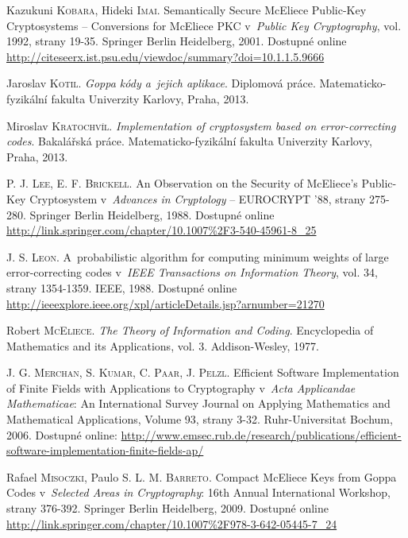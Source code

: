 \documentclass[thesis=M,czech,hidelinks]{FITthesis}[2012/06/26]
\newcommand{\0}{{\textcolor[gray]{0.75}{0}}}
\begin{document}
\begin{thebibliography}{99}
        Kazukuni \textsc{Kobara}, Hideki \textsc{Imai}. Semantically Secure
        McEliece Public-Key Cryptosystems -- Conversions for McEliece PKC
        v~\emph{Public Key Cryptography}, vol. 1992, strany 19-35. Springer
        Berlin Heidelberg, 2001. Dostupné online
        \url{http://citeseerx.ist.psu.edu/viewdoc/summary?doi=10.1.1.5.9666}

        Jaroslav \textsc{Kotil}. \emph{Goppa kódy a~jejich aplikace}. Diplomová
        práce. Matematicko-fyzikální fakulta Univerzity Karlovy, Praha, 2013.

        Miroslav \textsc{Kratochvíl}. \emph{Implementation of cryptosystem based
        on error-correcting codes}. Bakalářská práce. Matematicko-fyzikální
        fakulta Univerzity Karlovy, Praha, 2013.

        P. J. \textsc{Lee}, E. F. \textsc{Brickell}. An Observation on the
        Security of McEliece's Public-Key Cryptosystem v~\emph{Advances in
        Cryptology} -- EUROCRYPT '88, strany 275-280. Springer Berlin
        Heidelberg, 1988. Dostupné online
        \url{http://link.springer.com/chapter/10.1007\%2F3-540-45961-8\_25}

        J. S. \textsc{Leon}. A~probabilistic algorithm for computing minimum
        weights of large error-correcting codes v~\emph{IEEE Transactions on
        Information Theory}, vol. 34, strany 1354-1359. IEEE, 1988. Dostupné
        online
        \url{http://ieeexplore.ieee.org/xpl/articleDetails.jsp?arnumber=21270}

        Robert \textsc{McEliece}. \emph{The Theory of Information and Coding}.
        Encyclopedia of Mathematics and its Applications, vol. 3.
        Addison-Wesley, 1977.

        J. G. \textsc{Merchan}, S. \textsc{Kumar}, C. \textsc{Paar},
        J. \textsc{Pelzl}. Efficient Software Implementation of Finite
        Fields with Applications to Cryptography v~\emph{Acta Applicandae
        Mathematicae}: An International Survey Journal on Applying Mathematics
        and Mathematical Applications, Volume 93, strany  3-32.
        Ruhr-Universitat Bochum, 2006. Dostupné online:
        \url{http://www.emsec.rub.de/research/publications/efficient-software-implementation-finite-fields-ap/}

        Rafael \textsc{Misoczki}, Paulo S. L. M. \textsc{Barreto}. Compact
        McEliece Keys from Goppa Codes v~\emph{Selected Areas in Cryptography}:
        16th Annual International Workshop, strany 376-392. Springer Berlin
        Heidelberg, 2009. Dostupné online
        \url{http://link.springer.com/chapter/10.1007\%2F978-3-642-05445-7\_24}


\end{thebibliography}
\end{document}
